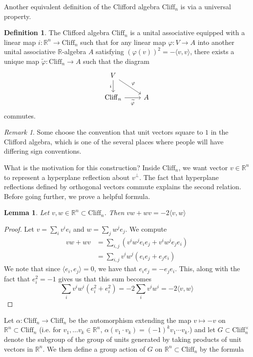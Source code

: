 \documentclass[psamsfonts, 12pt]{amsart}
\newtheorem{lem}[thm]{Lemma}
\theoremstyle{definition}
\newtheorem{defn}[thm]{Definition}
\theoremstyle{remark}
\newtheorem*{rem*}{Remark}
\newcommand{\R}{\mathbb{R}}
\newcommand{\Cliff}{\mathrm{Cliff}}
\begin{document}
Another equivalent definition of the Clifford algebra $\Cliff_n$ is via a universal
property.
%
\begin{defn}
The Clifford algebra $\Cliff_n$ is a unital associative equipped with a linear map
$i : \R^n \to \Cliff_n$ such that for any linear map $\varphi : V \to A$ into another
unital associative $\R$-algebra $A$ satisfying $(\varphi(v))^2 = -\langle v,v \rangle$,
there exists a unique map  $\widetilde{\varphi} : \Cliff_n \to A$ such that the diagram
\[\begin{tikzcd}
V \ar[d, "i"'] \ar[dr, "\varphi"]\\
\Cliff_n \ar[r, "\widetilde{\varphi}"'] & A
\end{tikzcd}\]
commutes.
\end{defn}
%
\begin{rem*}
Some choose the convention that unit vectors square to $1$ in the Clifford algebra, which
is one of the several places where people will have differing sign conventions.
\end{rem*}
%
What is the motivation for this construction? Inside $\Cliff_n$, we want vector
$v \in \R^n$ to represent a hyperplane reflection about $v^\perp$. The fact that
hyperplane reflections defined by orthogonal vectors commute explains the second
relation. Before going further, we prove a helpful formula.
%
\begin{lem}
Let $v,w \in \R^n \subset \Cliff_n$. Then $vw+wv = -2\langle v,w\rangle$
\end{lem}
%
\begin{proof}
Let $v = \sum_i v^ie_i$ and $w = \sum_j w^je_j$. We compute
\begin{align*}
vw+wv &= \sum_{i,j} (v^iw^je_ie_j + v^iw^je_je_i) \\
&= \sum_{i,j} v^iw^j(e_ie_j + e_je_i)
\end{align*}
We note that since $\langle e_i, e_j \rangle = 0$, we have that $e_ie_j = -e_je_i$. This,
along with the fact that $e_i^2 = -1$ gives us that this sum becomes
\[
\sum_i v^iw^i(e_i^2+e_i^2) = -2\sum_i v^iw^i = -2\langle v,w \rangle
\]
\end{proof}
%
Let $\alpha : \Cliff_n \to \Cliff_n$ be the automorphism extending the map
$v \mapsto -v$ on $\R^n \subset \Cliff_n$ (i.e. for $v_1,\ldots v_k \in \R^n$,
$\alpha(v_1\cdot v_k) = (-1)^kv_1\cdots v_k$.) and let $G \subset \Cliff_n^\times$
denote the subgroup of the group of units generated by taking products of unit vectors
in $\R^n$. We then define a group action of $G$ on $\R^n \subset \Cliff_n$ by the formula
\end{document}
